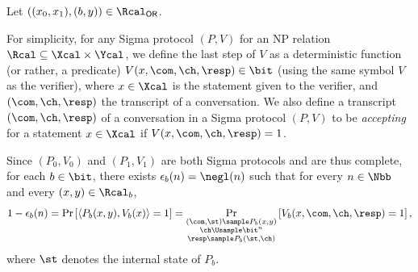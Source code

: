 \begin{answer}
    \leavevmode\par
    Let $((x_0, x_1), (b, y)) \in \Rcal_{\mathsf{OR}}$.
    
    For simplicity, for any Sigma protocol $(P, V)$ for an NP relation $\Rcal\subseteq \Xcal\times \Ycal$, we define the last step of $V$ as a deterministic function (or rather, a predicate) $V(x, \com, \ch, \resp)\in\bit$ (using the same symbol $V$ as the verifier), where $x\in\Xcal$ is the statement given to the verifier, and $(\com, \ch, \resp)$ the transcript of a conversation. We also define a transcript $(\com, \ch, \resp)$ of a conversation in a Sigma protocol $(P, V)$ to be \textit{accepting} for a statement $x\in\Xcal$ if $V(x, \com, \ch, \resp)=1$.

    Since $(P_0, V_0)$ and $(P_1, V_1)$ are both Sigma protocols and are thus complete, for each  $b\in\bit$, there exists $\epsilon_b(n)=\negl(n)$ such that for every $n\in\Nbb$ and every $(x, y)\in \Rcal_b$, 
    \begin{equation}\label{eq:p5-1-1}
        1-\epsilon_b(n)= \Pr\left[\langle P_b(x, y), V_b(x) \rangle =1\right]
        = \Pr_{\substack{(\com, \st)\sample P_b(x, y)\\\ch \Usample \bit^n \\\resp \sample  P_b(\st, \ch)}}\left[ V_b(x, \com, \ch, \resp) = 1\right],
    \end{equation}
    where  $\st$ denotes the internal state of $P_b$.


\end{answer}
